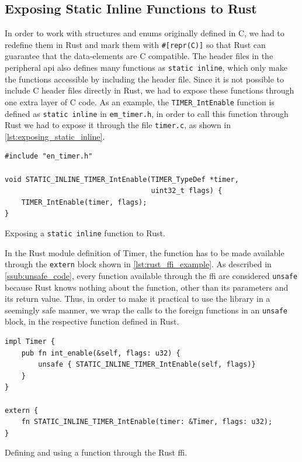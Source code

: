 \subsection{Exposing Static Inline Functions to Rust}

In order to work with structures and enums originally defined in C, we had to redefine them in Rust and mark them with \texttt{\#[repr(C)]} so that Rust can guarantee that the data-elements are C compatible.
The header files in the peripheral \gls{api} also defines many functions as \texttt{static inline}, which only make the functions accessible by including the header file.
Since it is not possible to include C header files directly in Rust, we had to expose these functions through one extra layer of C code.
As an example, the \texttt{TIMER\_IntEnable} function is defined as \texttt{static inline} in \texttt{em\_timer.h}, in order to call this function through Rust we had to expose it through the file \texttt{timer.c}, as shown in \autoref{lst:exposing_static_inline}.

\begin{listing}[h]
\begin{verbatim}
#include "en_timer.h"

void STATIC_INLINE_TIMER_IntEnable(TIMER_TypeDef *timer,
                                   uint32_t flags) {
    TIMER_IntEnable(timer, flags);
}
\end{verbatim}
\caption{Exposing a \texttt{static inline} function to Rust.}
\label{lst:exposing_static_inline}
\end{listing}

In the Rust module definition of Timer, the function has to be made available through the \texttt{extern} block shown in \autoref{lst:rust_ffi_example}.
As described in \autoref{ssub:unsafe_code}, every function available through the \gls{ffi} are considered \texttt{unsafe} because Rust knows nothing about the function, other than its parameters and its return value.
Thus, in order to make it practical to use the library in a seemingly safe manner, we wrap the calls to the foreign functions in an \texttt{unsafe} block, in the respective function defined in Rust.

\begin{listing}[h]
\begin{verbatim}
impl Timer {
    pub fn int_enable(&self, flags: u32) {
        unsafe { STATIC_INLINE_TIMER_IntEnable(self, flags)}
    }
}

extern {
    fn STATIC_INLINE_TIMER_IntEnable(timer: &Timer, flags: u32);
}
\end{verbatim}
\caption{Defining and using a function through the Rust \gls{ffi}.}
\label{lst:rust_ffi_example}
\end{listing}

